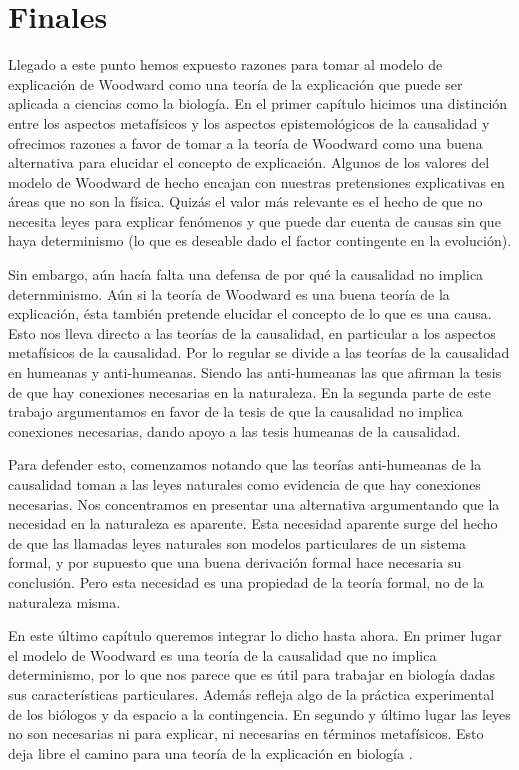 \section{Finales}

Llegado a este punto hemos expuesto razones para tomar al modelo de explicación de Woodward como una teoría de la explicación que puede ser aplicada a ciencias como la biología. En el primer capítulo hicimos una distinción entre los aspectos metafísicos y los aspectos epistemológicos de la causalidad y ofrecimos razones a favor de tomar a la teoría de Woodward como una buena alternativa para elucidar el concepto de explicación. Algunos de los valores del modelo de Woodward de hecho encajan con nuestras pretensiones explicativas en áreas que no son la física. Quizás el valor más relevante es el hecho de que no necesita leyes para explicar fenómenos y que puede dar cuenta de causas sin que haya determinismo (lo que es deseable dado el factor contingente en la evolución).

Sin embargo, aún hacía falta una defensa de por qué la causalidad no implica deternminismo. Aún si la teoría de Woodward es una buena teoría de la explicación, ésta también pretende elucidar el concepto de lo que es una causa. Esto nos lleva directo a las teorías de la causalidad, en particular a los aspectos metafísicos de la causalidad. Por lo regular se divide a las teorías de la causalidad en humeanas y anti-humeanas. Siendo las anti-humeanas las que afirman la tesis de que hay conexiones necesarias en la naturaleza. En la segunda parte de este trabajo argumentamos en favor de la tesis de que la causalidad no implica conexiones necesarias, dando apoyo a las tesis humeanas de la causalidad.

Para defender esto, comenzamos notando que las teorías anti-humeanas de la causalidad toman a las leyes naturales como evidencia de que hay conexiones necesarias. Nos concentramos en presentar una alternativa argumentando que la necesidad en la naturaleza es aparente. Esta necesidad aparente surge del hecho de que las llamadas leyes naturales son modelos particulares de un sistema formal, y por supuesto que una buena derivación formal hace necesaria su conclusión. Pero esta necesidad es una propiedad de la teoría formal, no de la naturaleza misma.

En este último capítulo queremos integrar lo dicho hasta ahora. En primer lugar el modelo de Woodward es una teoría de la causalidad que no implica determinismo, por lo que nos parece que es útil para trabajar en biología dadas sus características particulares. Además refleja algo de la práctica experimental de los biólogos y da espacio a la contingencia. En segundo y último lugar las leyes no son necesarias ni para explicar, ni necesarias en términos metafísicos. Esto deja libre el camino para una teoría de la explicación en biología \cite{Brandon1997}.



